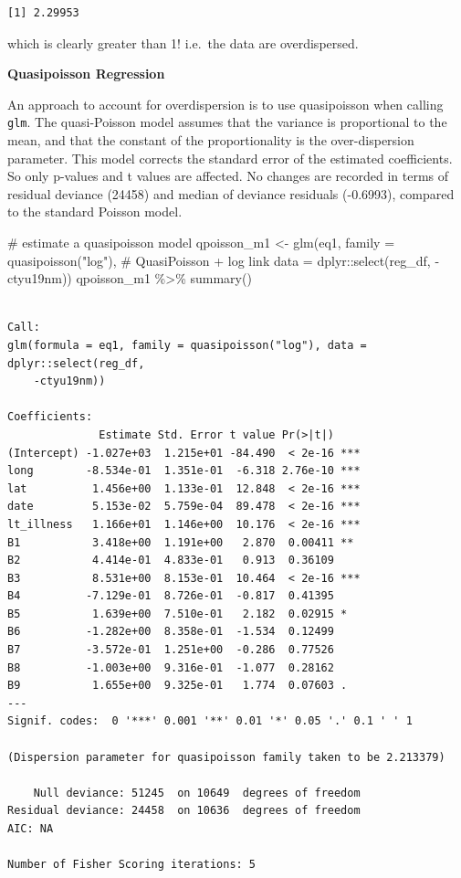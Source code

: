 \documentclass[
  letterpaper,
  DIV=11,
  numbers=noendperiod,
  oneside]{scrreprt}
\newenvironment{Shaded}{\begin{snugshade}}{\end{snugshade}}
\newcommand{\AttributeTok}[1]{\textcolor[rgb]{0.40,0.45,0.13}{#1}}
\newcommand{\CommentTok}[1]{\textcolor[rgb]{0.37,0.37,0.37}{#1}}
\newcommand{\FunctionTok}[1]{\textcolor[rgb]{0.28,0.35,0.67}{#1}}
\newcommand{\NormalTok}[1]{\textcolor[rgb]{0.00,0.23,0.31}{#1}}
\newcommand{\OtherTok}[1]{\textcolor[rgb]{0.00,0.23,0.31}{#1}}
\newcommand{\SpecialCharTok}[1]{\textcolor[rgb]{0.37,0.37,0.37}{#1}}
\newcommand{\StringTok}[1]{\textcolor[rgb]{0.13,0.47,0.30}{#1}}
\begin{document}
\begin{verbatim}
[1] 2.29953
\end{verbatim}

which is clearly greater than 1! i.e.~the data are overdispersed.

\textbf{Quasipoisson Regression}

An approach to account for overdispersion is to use quasipoisson when
calling \texttt{glm}. The quasi-Poisson model assumes that the variance
is proportional to the mean, and that the constant of the
proportionality is the over-dispersion parameter. This model corrects
the standard error of the estimated coefficients. So only p-values and t
values are affected. No changes are recorded in terms of residual
deviance (24458) and median of deviance residuals (-0.6993), compared to
the standard Poisson model.

\begin{Shaded}
\begin{Highlighting}[]
\CommentTok{\# estimate a quasipoisson model}
\NormalTok{qpoisson\_m1 }\OtherTok{\textless{}{-}} \FunctionTok{glm}\NormalTok{(eq1,}
                \AttributeTok{family =} \FunctionTok{quasipoisson}\NormalTok{(}\StringTok{"log"}\NormalTok{), }\CommentTok{\# QuasiPoisson + log link}
                \AttributeTok{data =}\NormalTok{ dplyr}\SpecialCharTok{::}\FunctionTok{select}\NormalTok{(reg\_df, }\SpecialCharTok{{-}}\NormalTok{ctyu19nm))}
\NormalTok{qpoisson\_m1 }\SpecialCharTok{\%\textgreater{}\%} \FunctionTok{summary}\NormalTok{()}
\end{Highlighting}
\end{Shaded}

\begin{verbatim}

Call:
glm(formula = eq1, family = quasipoisson("log"), data = dplyr::select(reg_df, 
    -ctyu19nm))

Coefficients:
              Estimate Std. Error t value Pr(>|t|)    
(Intercept) -1.027e+03  1.215e+01 -84.490  < 2e-16 ***
long        -8.534e-01  1.351e-01  -6.318 2.76e-10 ***
lat          1.456e+00  1.133e-01  12.848  < 2e-16 ***
date         5.153e-02  5.759e-04  89.478  < 2e-16 ***
lt_illness   1.166e+01  1.146e+00  10.176  < 2e-16 ***
B1           3.418e+00  1.191e+00   2.870  0.00411 ** 
B2           4.414e-01  4.833e-01   0.913  0.36109    
B3           8.531e+00  8.153e-01  10.464  < 2e-16 ***
B4          -7.129e-01  8.726e-01  -0.817  0.41395    
B5           1.639e+00  7.510e-01   2.182  0.02915 *  
B6          -1.282e+00  8.358e-01  -1.534  0.12499    
B7          -3.572e-01  1.251e+00  -0.286  0.77526    
B8          -1.003e+00  9.316e-01  -1.077  0.28162    
B9           1.655e+00  9.325e-01   1.774  0.07603 .  
---
Signif. codes:  0 '***' 0.001 '**' 0.01 '*' 0.05 '.' 0.1 ' ' 1

(Dispersion parameter for quasipoisson family taken to be 2.213379)

    Null deviance: 51245  on 10649  degrees of freedom
Residual deviance: 24458  on 10636  degrees of freedom
AIC: NA

Number of Fisher Scoring iterations: 5
\end{verbatim}
\end{document}
